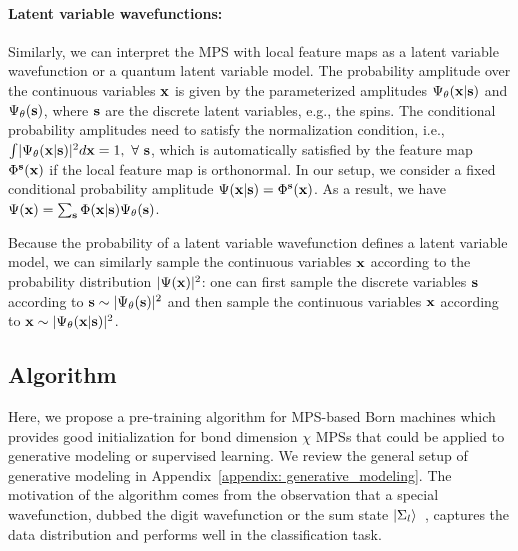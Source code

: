 \documentclass[nonatbib]{article}
\newcommand{\citep}{\cite}
\begin{document}
    
\paragraph{Latent variable wavefunctions:}
Similarly, we can interpret the MPS with local feature maps as a latent variable wavefunction or a quantum latent variable model. The probability amplitude over the continuous variables ${\bf x}$ is given by the parameterized amplitudes $\Psi_\theta({\bf x}| {\bf s})$ and $\Psi_\theta( {\bf s})$, where ${\bf s}$ are the discrete latent variables, e.g., the spins.
The conditional probability amplitudes need to satisfy the normalization condition, i.e., $ \int \lvert \Psi_\theta({\bf x}| {\bf s})\rvert^2 d{\bf x} = 1, \ \forall\ {\bf s}$, which is automatically satisfied by the feature map $\Phi^{\bf s}({\bf x})$ if the local feature map is orthonormal.
In our setup, we consider a fixed conditional probability amplitude $\Psi({\bf x}| {\bf s}) = \Phi^{\bf s}({\bf x})$.
As a result, we have $\Psi({\bf x}) = \sum_{\bf s} \Phi({\bf x}| {\bf s}) \Psi_\theta( {\bf s})$.
    
    
Because the probability of a latent variable wavefunction defines a latent variable model, we can similarly sample the continuous variables ${\bf x}$ according to the probability distribution $| \Psi({\bf x}) |^2$: one can first sample the discrete variables ${\bf s}$ according to ${\bf s} \sim | \Psi_\theta({\bf s}) |^2$ and then sample the continuous variables ${\bf x}$ according to ${\bf x} \sim | \Psi_\theta({\bf x} | {\bf s}) |^2$.









\subsection{Algorithm \label{sec: algorithm}}

Here, we propose a pre-training algorithm for MPS-based Born machines which provides good initialization for bond dimension $\chi$ MPSs that could be applied to generative modeling or supervised learning.
We review the general setup of generative modeling in Appendix~\ref{appendix: generative_modeling}.
The motivation of the algorithm comes from the observation that a special wavefunction, dubbed the digit wavefunction or the sum state $\ket{\Sigma_l}$~\citep{martyn2020entanglement}, captures the data distribution and performs well in the classification task.
\end{document}
